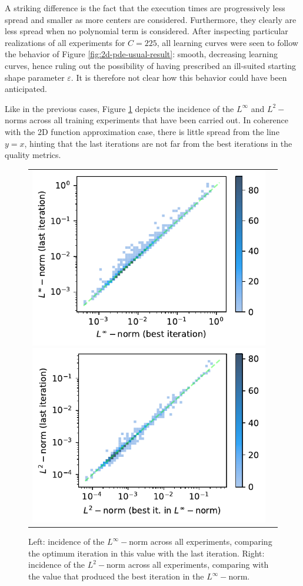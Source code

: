\documentclass[12pt]{report} %
\begin{document}
A striking difference is the fact that the execution times are progressively less spread and smaller as more centers are considered. Furthermore, they clearly are less spread when no polynomial term is considered. After inspecting particular realizations of all experiments for $C=225$, all learning curves were seen to follow the behavior of Figure \ref{fig:2d-pde-usual-result}: smooth, decreasing learning curves, hence ruling out the possibility of having prescribed an ill-suited starting shape parameter $\varepsilon$. It is therefore not clear how this behavior could have been anticipated.

Like in the previous cases, Figure \ref{fig:pde-2d-results-incidence-l-norms} depicts the incidence of the $L^\infty$ and $L^2-$norms across all training experiments that have been carried out. In coherence with the 2D function approximation case, there is little spread from the line $y=x$, hinting that the last iterations are not far from the best iterations in the quality metrics.

\begin{figure}[h]
  \hspace*{-2cm}
  \begin{tabular}{cc}
    \includegraphics[width=.6\textwidth]{imagenes/experiments/2d/pde_parabola/incidence_of_linf.pdf}
    \includegraphics[width=.6\textwidth]{imagenes/experiments/2d/pde_parabola/incidence_of_l2.pdf}
  \end{tabular}
  \caption{Left: incidence of the $L^\infty-$norm across all experiments, comparing the optimum iteration in this value with the last iteration. Right: incidence of the $L^2-$norm across all experiments, comparing with the value that produced the best iteration in the $L^\infty-$norm.}
  \label{fig:pde-2d-results-incidence-l-norms}
\end{figure}
\end{document}
